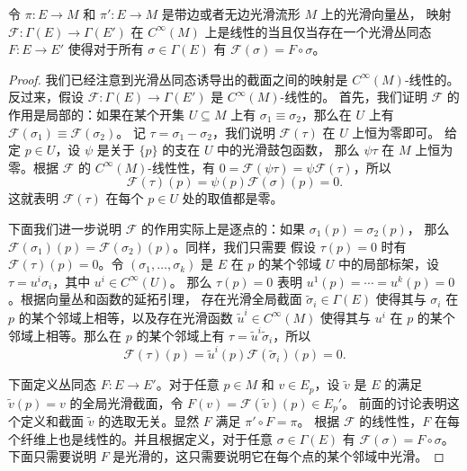 \begin{lemma}[丛同态表征引理]\label{lemma:bundle homomorphism characterization}
  令 $\pi:E\to M$ 和 $\pi':E\to M$ 是带边或者无边光滑流形 $M$ 上的光滑向量丛，
  映射 $\mathcal{F}:\Gamma(E)\to\Gamma(E')$ 在 $C^\infty(M)$
  上是线性的当且仅当存在一个光滑丛同态 $F:E\to E'$
  使得对于所有 $\sigma\in\Gamma(E)$ 有 $\mathcal{F}(\sigma)=F\circ\sigma$。
\end{lemma}
\begin{proof}
  我们已经注意到光滑丛同态诱导出的截面之间的映射是 $C^\infty(M)$-线性的。
  反过来，假设 $\mathcal{F}:\Gamma(E)\to\Gamma(E')$ 是 $C^\infty(M)$-线性的。
  首先，我们证明 $\mathcal{F}$ 的作用是局部的：如果在某个开集 $U\subseteq M$
  上有 $\sigma_1\equiv \sigma_2$，那么在 $U$ 上有 $\mathcal{F}(\sigma_1)\equiv \mathcal{F}(\sigma_2)$。
  记 $\tau=\sigma_1-\sigma_2$，我们说明 $\mathcal{F}(\tau)$ 在 $U$ 上恒为零即可。
  给定 $p\in U$，设 $\psi$ 是关于 $\{p\}$ 的支在 $U$ 中的光滑鼓包函数，
  那么 $\psi\tau$ 在 $M$ 上恒为零。根据 $\mathcal{F}$ 的 $C^\infty(M)$-线性性，有 
  $0=\mathcal{F}(\psi\tau)=\psi \mathcal{F}(\tau)$，所以
  \[
    \mathcal{F}(\tau)(p)=\psi(p)\mathcal{F}(\sigma)(p)=0.
  \]
  这就表明 $\mathcal{F}(\tau)$ 在每个 $p\in U$ 处的取值都是零。

  下面我们进一步说明 $\mathcal{F}$ 的作用实际上是逐点的：如果 $\sigma_1(p)=\sigma_2(p)$，
  那么 $\mathcal{F}(\sigma_1)(p)=\mathcal{F}(\sigma_2)(p)$。同样，我们只需要
  假设 $\tau(p)=0$ 时有 $\mathcal{F}(\tau)(p)=0$。令 $(\sigma_1,\dots,\sigma_k)$
  是 $E$ 在 $p$ 的某个邻域 $U$ 中的局部标架，设 $\tau=u^i\sigma_i$，其中 $u^i\in C^\infty(U)$。
  那么 $\tau(p)=0$ 表明 $u^1(p)=\cdots=u^k(p)=0$。根据向量丛和函数的延拓引理，
  存在光滑全局截面 $\tilde{\sigma}_i\in\Gamma(E)$ 使得其与 $\sigma_i$ 在
  $p$ 的某个邻域上相等，以及存在光滑函数 $\tilde{u}^i\in C^\infty(M)$
  使得其与 $u^i$ 在 $p$ 的某个邻域上相等。那么在 $p$ 的某个邻域上有
  $\tau=\tilde{u}^i\tilde{\sigma}_i$，所以
  \[
    \mathcal{F}(\tau)(p)=\tilde{u}^i(p) \mathcal{F}(\tilde{\sigma}_i)(p)
    =0.
  \]

  下面定义丛同态 $F:E\to E'$。对于任意 $p\in M$ 和 $v\in E_p$，设 $\tilde{v}$
  是 $E$ 的满足 $\tilde{v}(p)=v$ 的全局光滑截面，令 $F(v)=\mathcal{F}(\tilde{v})(p)\in E_p'$。
  前面的讨论表明这个定义和截面 $\tilde{v}$ 的选取无关。显然 $F$ 满足 $\pi'\circ F=\pi$。
  根据 $\mathcal{F}$ 的线性性，$F$ 在每个纤维上也是线性的。并且根据定义，对于任意
  $\sigma\in\Gamma(E)$ 有 $\mathcal{F}(\sigma)=F\circ\sigma$。下面只需要说明
  $F$ 是光滑的，这只需要说明它在每个点的某个邻域中光滑。


\end{proof}
